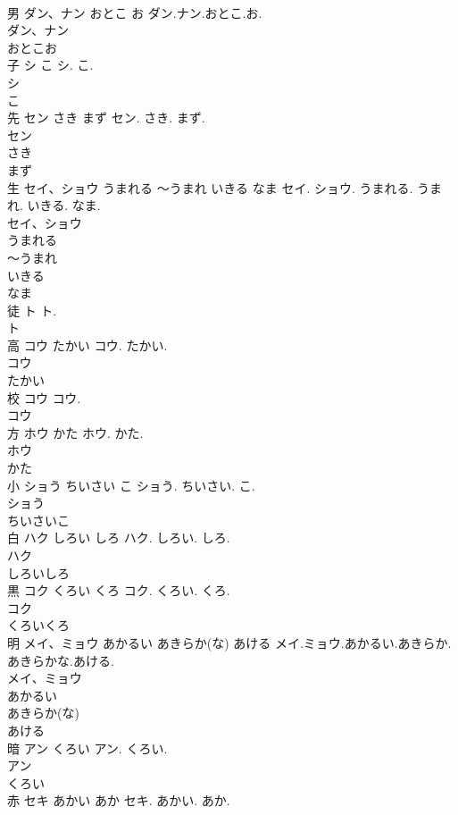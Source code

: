 \documentclass[8pt]{extreport}
\begin{document}
\begin{CJK}{UTF8}{min}
\\	男	ダン、ナン おとこ お	ダン.ナン.おとこ.お.	
\\	ダン、ナン
\\	おとこお
\\	子	シ こ	シ. こ.	
\\	シ
\\	こ
\\	先	セン さき まず	セン. さき. まず.	
\\	セン
\\	さき
\\	まず
\\	生	セイ、ショウ うまれる 〜うまれ いきる なま	セイ. ショウ. うまれる. うまれ. いきる. なま.	
\\	セイ、ショウ
\\	うまれる
\\	〜うまれ
\\	いきる
\\	なま
\\	徒	ト	ト.	
\\	ト
\\	高	コウ たかい	コウ. たかい.	
\\	コウ
\\	たかい
\\	校	コウ	コウ.	
\\	コウ
\\	方	ホウ かた	ホウ. かた.	
\\	ホウ
\\	かた
\\	小	ショう ちいさい こ	ショう. ちいさい. こ.	
\\	ショう
\\	ちいさいこ
\\	白	ハク しろい しろ	ハク. しろい. しろ.	
\\	ハク
\\	しろいしろ
\\	黒	コク くろい くろ	コク. くろい. くろ.	
\\	コク
\\	くろいくろ
\\	明	メイ、ミョウ あかるい あきらか(な) あける	メイ.ミョウ.あかるい.あきらか.あきらかな.あける.	
\\	メイ、ミョウ
\\	あかるい
\\	あきらか(な)
\\	あける
\\	暗	アン くろい	アン. くろい.	
\\	アン
\\	くろい
\\	赤	セキ あかい あか	セキ. あかい. あか.	

\end{CJK}
\end{document}
